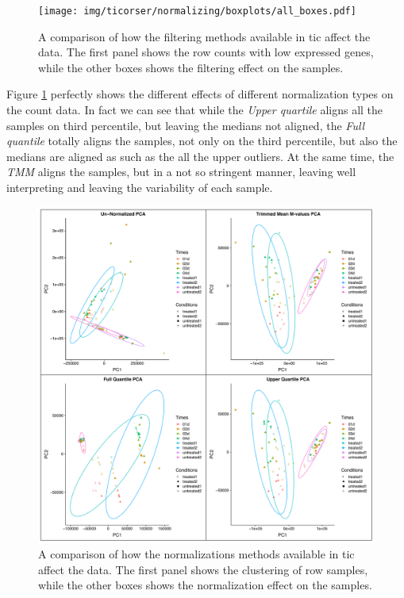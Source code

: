 \begin{figure}[H]
\texttt{[image: img/ticorser/normalizing/boxplots/all\_boxes.pdf]}
\caption[ticorser normalizing methods]{A comparison of how the filtering methods available in \gls{tic} affect the data.
The first panel shows the row counts with low expressed genes, while the other boxes shows the filtering effect on the samples.}
\label{fig:ticorsernormalizingbox}
\centering
\end{figure}

Figure \ref{fig:ticorsernormalizingbox} perfectly shows the different effects of different normalization types on the count data.  
In fact we can see that while the \textit{Upper quartile} aligns all the samples on third percentile, but leaving the medians not aligned, the \textit{Full quantile} totally aligns the samples, not only on the third percentile, but also the medians are aligned as such as the all the upper outliers.
At the same time, the \textit{TMM} aligns the samples, but in a not so stringent manner, leaving well interpreting and leaving the variability of each sample.

\begin{figure}[H]
\includegraphics[width=\textwidth,height=\textheight,keepaspectratio]{img/ticorser/normalizing/pca/all_pca.pdf}
\caption[ticorser normalizing methods]{A comparison of how the normalizations methods available in \gls{tic} affect the data.
The first panel shows the clustering of row samples, while the other boxes shows the normalization effect on the samples.}
\label{fig:ticorsernormalizingpca}
\centering
\end{figure}

